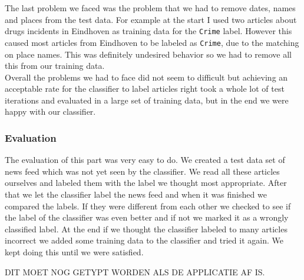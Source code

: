 The last problem we faced was the problem that we had to remove dates, names and places from the test data. For example at the start I used two articles about drugs incidents in Eindhoven as training data for the \texttt{Crime} label. However this caused most articles from Eindhoven to be labeled as \texttt{Crime}, due to the matching on place names. This was definitely undesired behavior so we had to remove all this from our training data. \\
Overall the problems we had to face did not seem to difficult but achieving an acceptable rate for the classifier to label articles right took a whole lot of test iterations and evaluated in a large set of training data, but in the end we were happy with our classifier.

\subsubsection*{Evaluation }
The evaluation of this part was very easy to do. We created a test data set of news feed which was not yet seen by the classifier. We read all these articles ourselves and labeled them with the label we thought most appropriate. After that we let the classifier label the news feed and when it was finished we compared the labels. If they were different from each other we checked to see if the label of the classifier was even better and if not we marked it as a wrongly classified label. At the end if we thought the classifier labeled to many articles incorrect we added some training data to the classifier and tried it again. We kept doing this until we were satisfied. 

DIT MOET NOG GETYPT WORDEN ALS DE APPLICATIE AF IS.

